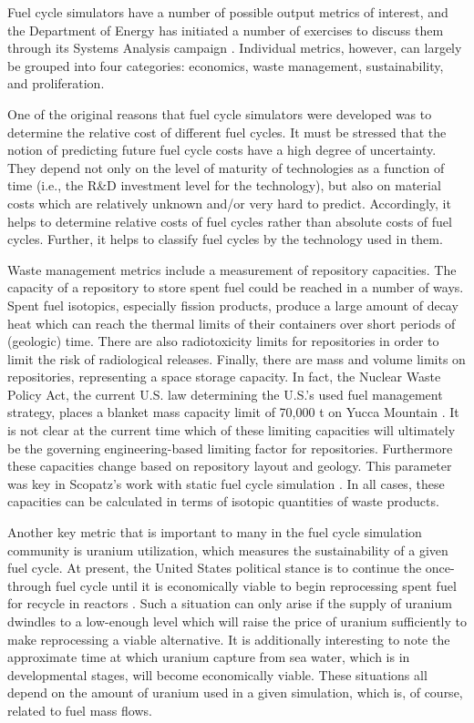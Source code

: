 Fuel cycle simulators have a number of possible output metrics of interest, and
the Department of Energy has initiated a number of exercises to discuss them
through its Systems Analysis campaign \cite{nutt_proposed_2012,
taiwo_summary_2012}. Individual metrics, however, can largely be grouped into
four categories: economics, waste management, sustainability, and proliferation.

One of the original reasons that fuel cycle simulators were developed was to
determine the relative cost of different fuel cycles. It must be stressed that
the notion of predicting future fuel cycle costs have a high degree of
uncertainty. They depend not only on the level of maturity of technologies as a
function of time (i.e., the R\&D investment level for the technology), but also
on material costs which are relatively unknown and/or very hard to
predict. Accordingly, it helps to determine relative costs of fuel cycles rather
than absolute costs of fuel cycles. Further, it helps to classify fuel cycles by
the technology used in them.

Waste management metrics include a measurement of repository capacities. The
capacity of a repository to store spent fuel could be reached in a number of
ways. Spent fuel isotopics, especially fission products, produce a large amount
of decay heat which can reach the thermal limits of their containers over short
periods of (geologic) time. There are also radiotoxicity limits for repositories
in order to limit the risk of radiological releases. Finally, there are mass and
volume limits on repositories, representing a space storage capacity. In fact,
the Nuclear Waste Policy Act, the current U.S. law determining the U.S.'s used
fuel management strategy, places a blanket mass capacity limit of 70,000 t on
Yucca Mountain \cite{us_nuclear_1982}.  It is not clear at the current time
which of these limiting capacities will ultimately be the governing
engineering-based limiting factor for repositories. Furthermore these capacities
change based on repository layout and geology.  This parameter was key in
Scopatz's work with static fuel cycle simulation
\cite{scopatz_essential_2011}. In all cases, these capacities can be calculated
in terms of isotopic quantities of waste products. 

Another key metric that is important to many in the fuel cycle simulation
community is uranium utilization, which measures the sustainability of a given
fuel cycle. At present, the United States political stance is to continue the
once-through fuel cycle until it is economically viable to begin reprocessing
spent fuel for recycle in reactors \cite{hamilton_blue_2012}. Such a situation
can only arise if the supply of uranium dwindles to a low-enough level which
will raise the price of uranium sufficiently to make reprocessing a viable
alternative. It is additionally interesting to note the approximate time at
which uranium capture from sea water, which is in developmental stages, will
become economically viable. These situations all depend on the amount of uranium
used in a given simulation, which is, of course, related to fuel mass flows.

